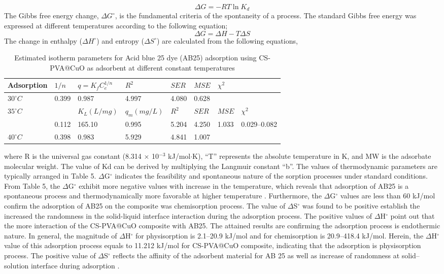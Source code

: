 \documentclass[final,5p,times,twocolumn,authoryear]{elsarticle}
\begin{document}
\begin{equation}
\Delta G = -RT \ln K_d
\label{eq:1}
\end{equation}
The Gibbs free energy change, $\Delta G^{\circ}$, is the fundamental criteria of the spontaneity of a process. The standard Gibbs free energy was expressed at different temperatures according to the following equation;
\begin{equation}
\Delta G = \Delta H - T\Delta S
\label{eq:2}
\end{equation}
The change in enthalpy ($\Delta H^{\circ}$) and entropy ($\Delta S^{\circ}$) are calculated from the following equations,
\begin{table}[htbp]
\centering
\caption{Estimated isotherm parameters for Acid blue 25 dye (AB25) adsorption using CS-PVA@CuO as adsorbent at different constant temperatures}
\label{tab:1}
\begin{tabular}{llllll}
\hline
Adsorption & $1/n$ & $q = K_f C_e^{1/n}$ & $R^2$ & $SER$ & $MSE$ & $\chi^2$ \\
\hline
$30 ^{\circ}C$ & 0.399 & 0.987 & 4.997 & 4.080 & 0.628 & \\
$35 ^{\circ}C$ & & $K_L (L/mg)$ & $q_m (mg/L)$ & $R^2$ & $SER$ & $MSE$ & $\chi^2$ \\
 & 0.112 & 165.10 & 0.995 & 5.204 & 4.250 & 1.033 & 0.029--0.082 \\
$40 ^{\circ}C$ & 0.398 & 0.983 & 5.929 & 4.841 & 1.007 & \\
\hline
\end{tabular}
\end{table}

where R is the universal gas constant (8.314 $\times$ 10$^{-3}$ kJ/mol$\cdot$K), ``T'' represents the absolute temperature in K, and MW is the adsorbate molecular weight. The value of Kd can be derived by multiplying the Langmuir constant ``b''. The values of thermodynamic parameters are typically arranged in Table 5. $\Delta$G$^{\circ}$ indicates the feasibility and spontaneous nature of the sorption processes under standard conditions. From Table 5, the $\Delta$G$^{\circ}$ exhibit more negative values with increase in the temperature, which reveals that adsorption of AB25 is a spontaneous process and thermodynamically more favorable at higher temperature \cite{44}. Furthermore, the $\Delta$G$^{\circ}$ values are less than 60 kJ/mol confirm the adsorption of AB25 on the composite was chemisorption process. The value of $\Delta$S$^{\circ}$ was found to be positive establish the increased the randomness in the solid-liquid interface interaction during the adsorption process. The positive values of $\Delta$H$^{\circ}$ point out that the more interaction of the CS-PVA@CuO composite with AB25. The attained results are confirming the adsorption process is endothermic nature. In general, the magnitude of $\Delta$H$^{\circ}$ for physisorption is 2.1--20.9 kJ/mol and for chemisorption is 20.9--418.4 kJ/mol. Herein, the $\Delta$H$^{\circ}$ value of this adsorption process equals to 11.212 kJ/mol for CS-PVA@CuO composite, indicating that the adsorption is physisorption process. The positive value of $\Delta$S$^{\circ}$ reflects the affinity of the adsorbent material for AB 25 as well as increase of randomness at solid--solution interface during adsorption \cite{44,45}.
\end{document}
